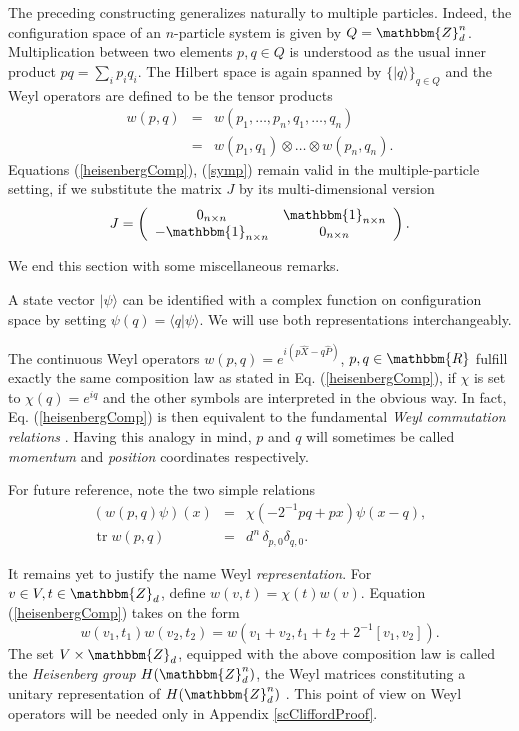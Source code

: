 \documentclass[aps,twocolumn,floatfix]{revtex4}
\def\ket#1.{|#1\rangle}
\def\braket#1,#2.{\langle#1|#2\rangle}
\def\ZZ{\mathbbm{Z}}
\def\RR{\mathbbm{R}}
\def\Id{\mathbbm{1}}
\DeclareMathOperator{\tr}{tr}
\begin{document}
The preceding constructing generalizes naturally to multiple particles. 
Indeed, the configuration space of an $n$-particle system is given by
$Q=\ZZ_d^n$. Multiplication between two elements $p,q\in Q$ is
understood as the usual inner product $pq = \sum_i p_i q_i$. The
Hilbert space is again spanned by $\{\ket q.\}_{q\in Q}$ and the Weyl
operators are defined to be the tensor products
\begin{eqnarray}\label{multipleWeyl}
	w(p,q) 
	&=& w(p_1, \dots, p_n, q_1, \dots, q_n) \\
	&=& w(p_1, q_1)\otimes \dots \otimes w(p_n, q_n).\nonumber
\end{eqnarray}
Equations (\ref{heisenbergComp}), (\ref{symp}) remain valid in the
multiple-particle setting, if we substitute the matrix $J$ by its
multi-dimensional version
\begin{equation*}
	J=
	\left(
		\begin{array}{cc}
			0_{n\times n}	&	\Id_{n\times n} \\
			-\Id_{n\times n} & 0_{n\times n}
		\end{array}
	\right).
\end{equation*}

We end this section with some miscellaneous remarks.

A state vector $\ket\psi.$ can be identified with a complex function on
configuration space by setting $\psi(q)=\braket q, \psi.$. We will use
both representations interchangeably.

The continuous Weyl operators $w(p,q)=e^{i(p \hat X - q \hat P)}$,
$p,q\in \RR$ fulfill exactly the same composition law as stated in Eq.
(\ref{heisenbergComp}), if $\chi$ is set to $\chi(q)=e^{iq}$ and the
other symbols are interpreted in the obvious way. In fact, Eq.
(\ref{heisenbergComp}) is then equivalent to the fundamental
\emph{Weyl commutation relations} \cite{folland}.  Having this analogy
in mind, $p$ and $q$ will sometimes be called \emph{momentum} and
\emph{position} coordinates respectively.

For future reference, note the two simple relations
\begin{eqnarray}
 	\left( w(p,q) \psi \right) (x) &=& \chi(-2^{-1} pq+px) \psi(x-q),
	\label{weylCoordinates} \\
	\tr w(p,q) &=& d^n \, \delta_{p,0}\delta_{q,0}.
	\label{weylTrace}
\end{eqnarray}

It remains yet to justify the name Weyl \emph{representation}. For
$v\in V, t\in \ZZ_d$, define $w(v,t)=\chi(t)w(v)$. Equation
(\ref{heisenbergComp}) takes on the form 
\begin{equation*}
	w(v_1,t_1)w(v_2,t_2)=w(v_1+v_2,t_1+t_2+2^{-1} [v_1,v_2]).
\end{equation*}
The set $V\times\ZZ_d$, equipped with the above composition law is
called the \emph{Heisenberg group} $H(\ZZ_d^n)$, the Weyl matrices
constituting a unitary representation of $H(\ZZ_d^n)$ \cite{folland}.
This point of view on Weyl operators will be needed only in Appendix
\ref{scCliffordProof}.
\end{document}
